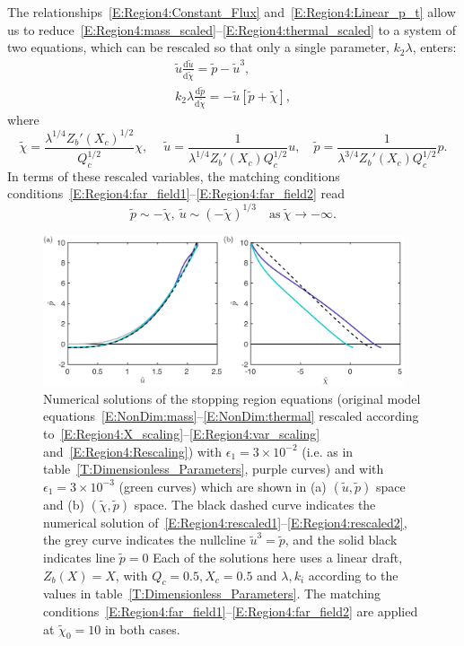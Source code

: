 \documentclass{jfm}
\newcommand{\dd}[2]{\frac{\mathrm{d} #1}{\mathrm{d} #2}}
\newcommand{\epsone}{\epsilon_{1}} %
\renewcommand{\p}{p} %
\begin{document}
The relationships~\eqref{E:Region4:Constant_Flux} and~\eqref{E:Region4:Linear_p_t} allow us to reduce~\eqref{E:Region4:mass_scaled}--\eqref{E:Region4:thermal_scaled} to a system of two equations, which can be rescaled so that only a single parameter, $k_2 \lambda$, enters:
\begin{align}
\tilde{u} \dd{\tilde{u}}{\tilde{\chi}} = \tilde{\p} - \tilde{u}^3,\label{E:Region4:rescaled1}\\
k_2 \lambda \dd{\tilde{\p}}{\tilde{\chi}} = -\tilde{u}\left[\tilde{p} + \tilde{\chi}\right],\label{E:Region4:rescaled2}
\end{align}
where
\begin{equation}\label{E:Region4:Rescaling}
\tilde{\chi} = \frac{\lambda^{1/4}Z_b'(X_c)^{1/2}}{Q_c^{1/2}}\chi, ~\quad  \tilde{u} = \frac{1}{\lambda^{1/4}Z_b'(X_c)Q_c^{1/2}}u,\quad \tilde{\p}= \frac{1}{\lambda^{3/4}Z_b'(X_c)Q_c^{1/2}}\p.
\end{equation} 
In terms of these rescaled variables, the matching conditions conditions~\eqref{E:Region4:far_field1}--\eqref{E:Region4:far_field2} read
\begin{equation}\label{E:Region4:Rescaled_farfield}
\tilde{\p} \sim -\tilde{\chi},~ \tilde{u}\sim (-\tilde{\chi})^{1/3}\quad \text{as}~\tilde{\chi}\to -\infty.
\end{equation}


\begin{figure}
\centering
\includegraphics[width = 0.95\textwidth]{figures/fig5_transition_region_both.pdf}
\caption{Numerical solutions of the stopping region equations (original model equations~\eqref{E:NonDim:mass}--\eqref{E:NonDim:thermal} rescaled according to~\eqref{E:Region4:X_scaling}--\eqref{E:Region4:var_scaling} and~\eqref{E:Region4:Rescaling}) with $\epsone = 3\times 10^{-2}$ (i.e. as in table~\ref{T:Dimensionless_Parameters}, purple curves) and with $\epsone = 3\times 10^{-3}$ (green curves) which are shown in (a) $(\tilde{u}, \tilde{\p})$ space and (b) $(\tilde{\chi}, \tilde{\p})$ space. The black dashed curve indicates the numerical solution of~\eqref{E:Region4:rescaled1}--\eqref{E:Region4:rescaled2}, the grey curve indicates the nullcline $\tilde{u}^3 = \tilde{\p}$, and the solid black indicates line $\tilde{p} = 0$ Each of the solutions here uses a linear draft, $Z_b(X) = X$, with $Q_c = 0.5, X_c = 0.5$ and $\lambda, k_i$ according to the values in table~\ref{T:Dimensionless_Parameters}. The matching conditions~\eqref{E:Region4:far_field1}--\eqref{E:Region4:far_field2} are applied at $\tilde{\chi}_0 = 10$ in both cases. }\label{fig:Region4}
\end{figure}
\end{document}

